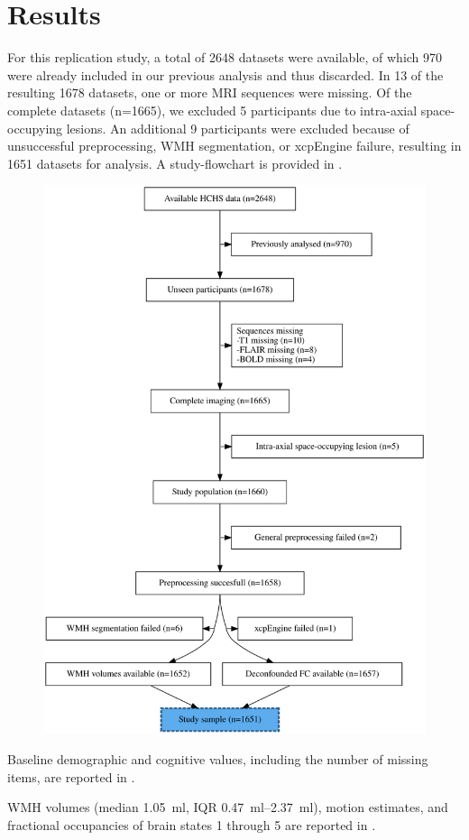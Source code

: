 \section{Results}
For this replication study, a total of \num{2648} datasets were available, of which \num{970} were already included in our previous analysis and thus discarded. In \num{13} of the resulting \num{1678} datasets, one or more MRI sequences were missing. Of the complete datasets (n=\num{1665}), we excluded \num{5} participants due to intra-axial space-occupying lesions. An additional \num{9} participants were excluded because of unsuccessful preprocessing, WMH segmentation, or xcpEngine failure, resulting in \num{1651} datasets for analysis. A study-flowchart is provided in .

\begin{figure}
    \includegraphics[width=0.5\linewidth]{./../analysis/code/R/FLOW.png}
    \label{fig:flowchart}
\end{figure}






Baseline demographic and cognitive values, including the number of missing items, are reported in .

WMH volumes (median \qty{1.05}{\milli\litre}, IQR \qtyrange{0.47}{2.37}{\milli\litre}), motion estimates, and fractional occupancies of brain states 1 through 5 are reported in . 


